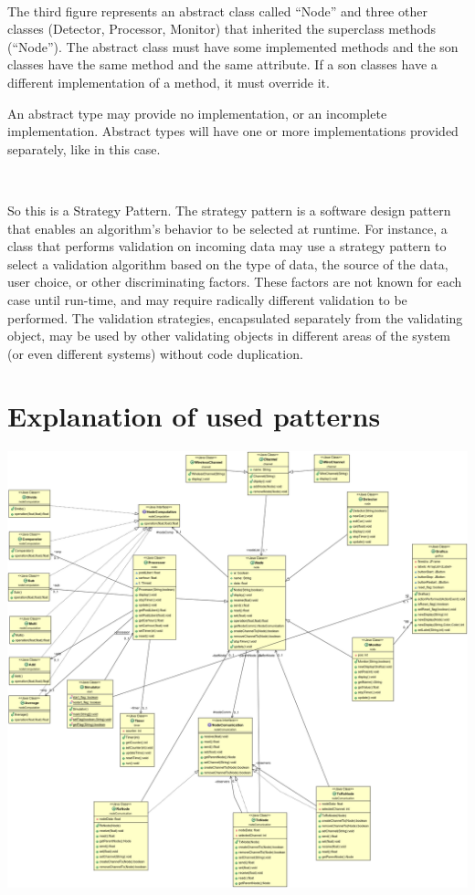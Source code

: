 \documentclass[a4paper,titlepage]{article}
\begin{document}
~

The third figure represents an abstract class called ``Node'' and three other classes (Detector, Processor, Monitor) that inherited the superclass methods (``Node''). The abstract class must have some implemented methods and the son classes have the same method and the same attribute. If a son classes have a different implementation of a method, it must override it.

An abstract type may provide no implementation, or an incomplete implementation. Abstract types will have one or more implementations provided separately, like in this case.

~

So this is a Strategy Pattern. The strategy pattern is a software design pattern that enables an algorithm's behavior to be selected at runtime. For instance, a class that performs validation on incoming data may use a strategy pattern to select a validation algorithm based on the type of data, the source of the data, user choice, or other discriminating factors. These factors are not known for each case until run-time, and may require radically different validation to be performed. The validation strategies, encapsulated separately from the validating object, may be used by other validating objects in different areas of the system (or even different systems) without code duplication.

\newpage
\section*{Explanation of used patterns}

    \begin{center}

    \centering
    \includegraphics[scale=0.30]{ClassDiagram.png}

    \end{center}
\end{document}
